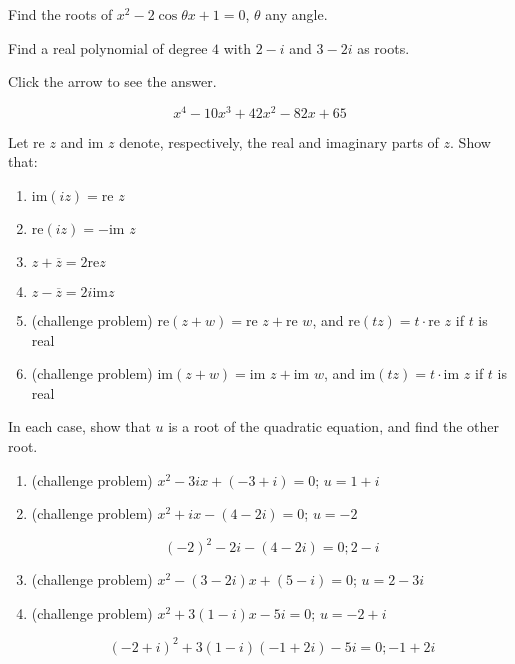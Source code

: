 \documentclass{ximera}
\begin{document}
\begin{problem}\label{prb:A.7}
Find the roots of $x^{2} - 2\cos \theta x + 1 = 0$, $\theta$ any angle.
\end{problem}

\begin{problem}\label{prb:A.8}
Find a real polynomial of degree $4$ with $2 - i$ and $3 - 2i$ as roots.

Click the arrow to see the answer.
\begin{expandable}
$$x^{4} - 10x^{3} + 42x^{2} - 82x + 65$$
\end{expandable}
\end{problem}

\begin{problem}\label{prb:A.9}
Let $\mbox{re }z$ and $\mbox{im }z$ denote, respectively, the real and imaginary parts of $z$. Show that:

\begin{enumerate}
\item $\mbox{im}(iz) = \mbox{re }z$
\item $\mbox{re}(iz) = -\mbox{im }z$
\item $z + \overline{z} = 2 \mbox{re}z$
\item $z - \overline{z} = 2i \mbox{im} z$
\item (challenge problem) $\mbox{re}(z + w) = \mbox{re }z + \mbox{re }w$, and $\mbox{re}(tz) = t \cdot \mbox{re }z$ if $t$ is real
\item (challenge problem) $\mbox{im}(z + w) = \mbox{im }z + \mbox{im }w$, and $\mbox{im}(tz) = t \cdot \mbox{im }z$ if $t$ is real
\end{enumerate}
\end{problem}

\begin{problem}\label{prb:A.10}
In each case, show that $u$ is a root of the quadratic equation, and find the other root.

\begin{enumerate}
\item (challenge problem) $x^{2} - 3ix + (-3 + i) = 0$; $u = 1 + i$
\item (challenge problem) $x^{2} + ix - (4 - 2i) = 0$; $u = -2$
\begin{hint}
$$(-2)^{2} - 2i - (4 - 2i) = 0; 2 - i$$
\end{hint}
\item (challenge problem) $x^{2} - (3 - 2i)x + (5 - i) = 0$; $u = 2 - 3i$
\item (challenge problem) $x^{2} + 3(1 - i)x - 5i = 0$; $u = -2 + i$
\begin{hint}
$$(-2 + i)^{2} + 3(1 - i)(-1 + 2i) - 5i = 0; -1 + 2i$$
\end{hint}
\end{enumerate}
\end{problem}
\end{document}
